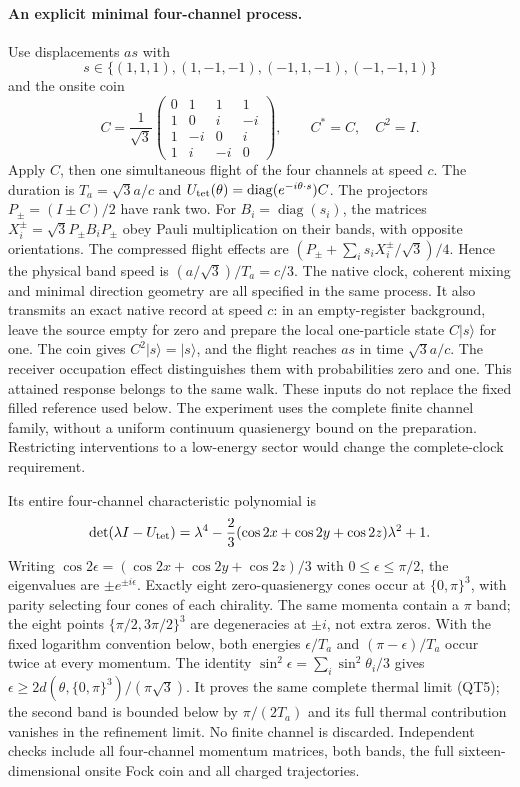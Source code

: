 \paragraph{An explicit minimal four-channel process.}
Use displacements $a s$ with
\[
 s\in\{(1,1,1),(1,-1,-1),(-1,1,-1),(-1,-1,1)\}
\]
and the onsite coin
\[
 C=\frac{1}{\sqrt3}
 \begin{pmatrix}
 0&1&1&1\\1&0&i&-i\\1&-i&0&i\\1&i&-i&0
 \end{pmatrix},\qquad C^*=C,\quad C^2=I.
\]
Apply $C$, then one simultaneous flight of the four channels at speed $c$.
The duration is $T_a=\sqrt3 a/c$ and
$U_{\rm tet}(\theta)=\operatorname{diag}(e^{-i\theta\cdot s})C$.
The projectors $P_\pm=(I\pm C)/2$ have rank two. For
$B_i=\operatorname{diag}(s_i)$, the matrices
$X_i^\pm=\sqrt3 P_\pm B_iP_\pm$ obey Pauli multiplication on their
bands, with opposite orientations. The compressed flight effects are
$(P_\pm+\sum_i s_iX_i^\pm/\sqrt3)/4$.
Hence the physical band speed is $(a/\sqrt3)/T_a=c/3$.
The native clock, coherent mixing and minimal direction geometry are all
specified in the same process.
It also transmits an exact native record at speed $c$: in an empty-register
background, leave the source empty for zero and prepare the local
one-particle state $C|s\rangle$ for one. The coin gives
$C^2|s\rangle=|s\rangle$, and the flight reaches $as$ in time
$\sqrt3a/c$. The receiver occupation effect distinguishes them with
probabilities zero and one. This attained response belongs to the same
walk. These inputs do not replace the fixed filled reference used below.
The experiment uses the complete finite channel family, without a uniform
continuum quasienergy bound on the preparation. Restricting interventions
to a low-energy sector would change the complete-clock requirement.

Its entire four-channel characteristic polynomial is
\[
 \det(\lambda I-U_{\rm tet})=
 \lambda^4-\frac{2}{3}(\cos2x+\cos2y+\cos2z)\lambda^2+1.
\]
Writing $\cos2\epsilon=(\cos2x+\cos2y+\cos2z)/3$ with
$0\leq\epsilon\leq\pi/2$, the eigenvalues are
$\pm e^{\pm i\epsilon}$. Exactly eight zero-quasienergy cones occur at
$\{0,\pi\}^3$, with parity selecting four cones of each chirality.
The same momenta contain a $\pi$ band; the eight points
$\{\pi/2,3\pi/2\}^3$ are degeneracies at $\pm i$, not extra zeros.
With the fixed logarithm convention below, both energies
$\epsilon/T_a$ and $(\pi-\epsilon)/T_a$ occur twice at every momentum.
The identity $\sin^2\epsilon=\sum_i\sin^2\theta_i/3$ gives
$\epsilon\geq2d(\theta,\{0,\pi\}^3)/(\pi\sqrt3)$.
It proves the same complete thermal limit (QT5); the second band is bounded
below by $\pi/(2T_a)$ and its full thermal contribution vanishes in the
refinement limit. No finite channel is discarded. Independent checks include
all four-channel momentum matrices, both bands, the full sixteen-dimensional
onsite Fock coin and all charged trajectories.

